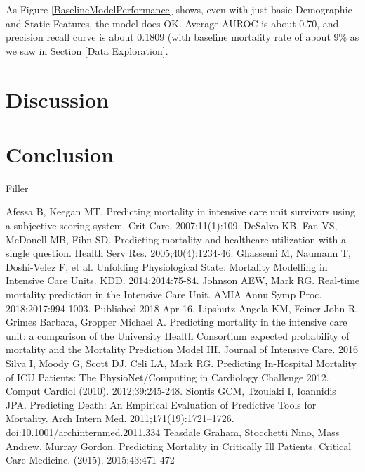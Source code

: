 \documentclass[12pt, final]{article}
\begin{document}
As Figure \ref{BaselineModelPerformance} shows, even with just basic Demographic and Static Features, the model does OK. Average AUROC is about 0.70, and precision recall curve is about 0.1809 (with baseline mortality rate of about 9\% as we saw in Section \ref{Data Exploration}.

\section{Discussion}
\label{Discussion}

\section{Conclusion}
\label{Conclusion}
Filler

  \begin{thebibliography}{1}
     Afessa B, Keegan MT. Predicting mortality in intensive care unit survivors using a subjective scoring system. Crit Care. 2007;11(1):109.   
     DeSalvo KB, Fan VS, McDonell MB, Fihn SD. Predicting mortality and healthcare utilization with a single question. Health Serv Res. 2005;40(4):1234-46. 
     Ghassemi M, Naumann T, Doshi-Velez F, et al. Unfolding Physiological State: Mortality Modelling in Intensive Care Units. KDD. 2014;2014:75-84.
     Johnson AEW, Mark RG. Real-time mortality prediction in the Intensive Care Unit. AMIA Annu Symp Proc. 2018;2017:994-1003. Published 2018 Apr 16.
     Lipshutz Angela KM, Feiner John R, Grimes Barbara, Gropper Michael A. Predicting mortality in the intensive care unit: a comparison of the University Health Consortium expected probability of mortality and the Mortality Prediction Model III. Journal of Intensive Care. 2016
     Silva I, Moody G, Scott DJ, Celi LA, Mark RG. Predicting In-Hospital Mortality of ICU Patients: The PhysioNet/Computing in Cardiology Challenge 2012. Comput Cardiol (2010). 2012;39:245-248.
	 Siontis GCM, Tzoulaki I, Ioannidis JPA. Predicting Death: An Empirical Evaluation of Predictive Tools for Mortality. Arch Intern Med. 2011;171(19):1721–1726. doi:10.1001/archinternmed.2011.334
	 Teasdale Graham, Stocchetti Nino, Mass Andrew, Murray Gordon. Predicting Mortality in Critically Ill Patients. Critical Care Medicine. (2015). 2015;43:471-472
  
  \end{thebibliography}
\end{document}
